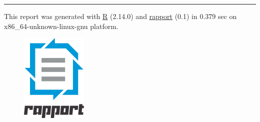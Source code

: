 \documentclass[]{article}
\makeatletter
\def\maxwidth{\ifdim\Gin@nat@width>\linewidth\linewidth
\else\Gin@nat@width\fi}
\let\Oldincludegraphics\includegraphics
\renewcommand{\includegraphics}[1]{\Oldincludegraphics[width=\maxwidth]{#1}}
\makeatother
\begin{document}
\begin{center}\rule{3in}{0.4pt}\end{center}

This report was generated with \href{http://www.r-project.org/}{R}
(2.14.0) and \href{http://al3xa.github.com/rapport/}{rapport} (0.1) in
0.379 sec on x86\_64-unknown-linux-gnu platform.

\begin{figure}[htbp]
\centering
\includegraphics{images/logo.png}
\caption{}
\end{figure}
\end{document}
